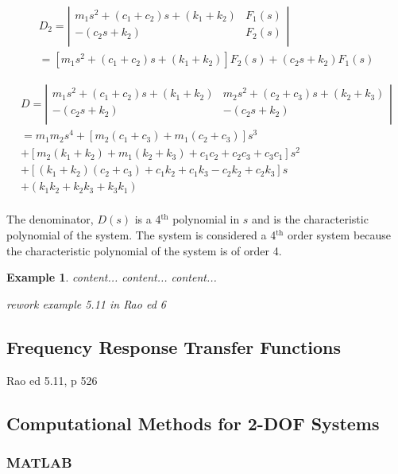 \documentclass[12pt,letter]{article}
\newtheorem{ex}{Example}
\numberwithin{ex}{section} %
\newenvironment{example}{\begin{mdframed}[middlelinewidth=0.5mm]\begin{ex}\normalfont}{\end{ex}\end{mdframed}}
\numberwithin{re}{section} %
\newcommand{\rd}[1]{\textcolor[rgb]{0.75,0.00,0.00}{#1}}
\begin{document}
\begin{eqnarray}
D_2 = \left|
\begin{array}{cc}
m_1 s^2 + (c_1 + c_2)s + (k_1+k_2)  & F_1(s) \\
-(c_2s+k_2)  & F_2(s) \\
\end{array}
\right| \\
= [m_1 s^2 + (c_1 + c_2)s + (k_1+k_2)]F_2(s) + (c_2s+k_2)F_1(s)  \nonumber
\end{eqnarray}

\begin{eqnarray}
D = \left|
\begin{array}{cc}
m_1 s^2 + (c_1 + c_2)s + (k_1+k_2) & m_2 s^2 + (c_2 + c_3)s + (k_2+k_3) \\
-(c_2s+k_2) & -(c_2s+k_2) \\
\end{array}
\right| \\ \nonumber
= m_1m_2s^4 + [m_2(c_1+c_3)+m_1(c_2+c_3)]s^3 \\  \nonumber
+ [m_2(k_1+k_2)+m_1(k_2+k_3)+c_1c_2+c_2c_3+c_3c_1]s^2 \\  \nonumber
+ [(k_1+k_2)(c_2+c_3)+c_1k_2+c_1k_3-c_2k_2+c_2k_3]s \\  \nonumber
+ (k_1k_2 + k_2k_3 + k_3k_1) \\  \nonumber
\end{eqnarray}

The denominator, $D(s)$ is a 4$^{\text{th}}$ polynomial in $s$ and is the characteristic polynomial of the system. The system is considered a 4$^{\text{th}}$ order system because the characteristic polynomial of the system is of order 4. 

\begin{example}
content...
content...
content...

\rd{rework example 5.11 in Rao ed 6}
\end{example}

\subsection{Frequency Response Transfer Functions}

\rd{Rao ed 5.11, p 526}


\subsection{Computational Methods for 2-DOF Systems}

\subsubsection{MATLAB}
\end{document}
